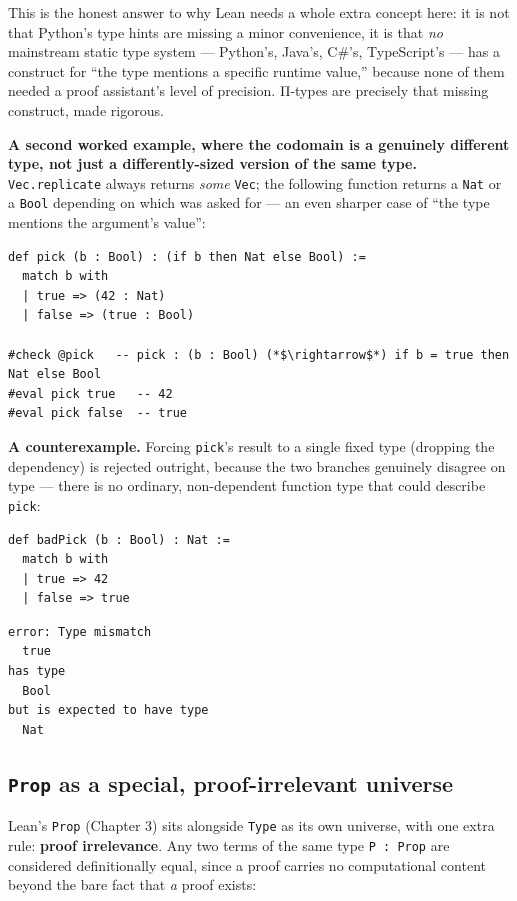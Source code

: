 This is the honest answer to why Lean needs a whole extra concept here: it is not that Python's type hints are missing a minor convenience, it is that \emph{no} mainstream static type system --- Python's, Java's, C\#'s, TypeScript's --- has a construct for ``the type mentions a specific runtime value,'' because none of them needed a proof assistant's level of precision. Π-types are precisely that missing construct, made rigorous.

\textbf{A second worked example, where the codomain is a genuinely different type, not just a differently-sized version of the same type.} \texttt{Vec.replicate} always returns \emph{some} \texttt{Vec}; the following function returns a \texttt{Nat} or a \texttt{Bool} depending on which was asked for --- an even sharper case of ``the type mentions the argument's value'':

\begin{lstlisting}
def pick (b : Bool) : (if b then Nat else Bool) :=
  match b with
  | true => (42 : Nat)
  | false => (true : Bool)

#check @pick   -- pick : (b : Bool) (*$\rightarrow$*) if b = true then Nat else Bool
#eval pick true   -- 42
#eval pick false  -- true
\end{lstlisting}

\textbf{A counterexample.} Forcing \texttt{pick}'s result to a single fixed type (dropping the dependency) is rejected outright, because the two branches genuinely disagree on type --- there is no ordinary, non-dependent function type that could describe \texttt{pick}:

\begin{lstlisting}
def badPick (b : Bool) : Nat :=
  match b with
  | true => 42
  | false => true
\end{lstlisting}

\begin{lstlisting}
error: Type mismatch
  true
has type
  Bool
but is expected to have type
  Nat
\end{lstlisting}

\subsection{\texorpdfstring{\texttt{Prop} as a special, proof-irrelevant universe}{Prop as a special, proof-irrelevant universe}}\label{sec:01-basics:05-pi-sigma-and-coc:3}

Lean's \texttt{Prop} (Chapter 3) sits alongside \texttt{Type} as its own universe, with one extra rule: \textbf{proof irrelevance}. Any two terms of the same type \texttt{P : Prop} are considered definitionally equal, since a proof carries no computational content beyond the bare fact that \emph{a} proof exists:

